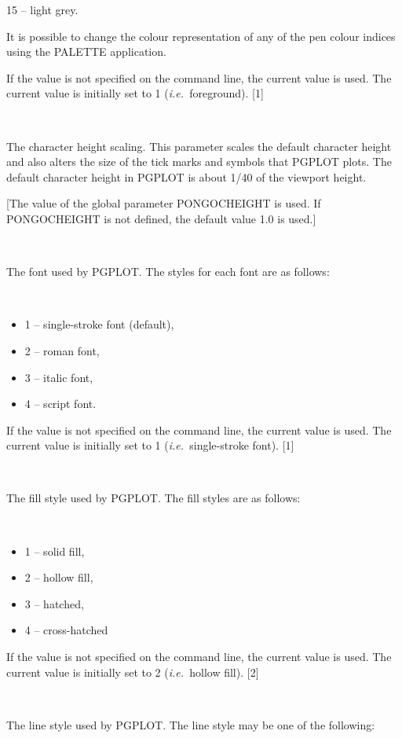 \documentclass[twoside,11pt]{article}
\renewcommand{\_}{\texttt{\symbol{95}}}
\newcommand{\ie}{{\em i.e.\ }}
\newcommand{\sstsubsection}[1]{ \item[{#1}] \mbox{} \\}
\newcommand{\sstitemlist}[1]{
  \mbox{} \\
  \vspace{-3.5ex}
  \begin{itemize}
     #1
  \end{itemize}
}
\newcommand{\sstitem}{\item}
\newcommand{\sstsubsection}[1]{\item[{#1}]}
\newcommand{\sstitemlist}[1]{
      \begin{itemize}
         #1
      \end{itemize}
      \\
   }
\newcommand{\sstitem}{\item}
\begin{document}
\begin{sloppypar}
{{{{            \sstitem
               15 -- light grey.

         }
         It is possible to change the colour representation of any of
         the pen colour indices using the PALETTE application.

         If the value is not specified on the command line, the current
         value is used. The current value is initially set to 1 
         (\ie foreground).
         [1]
      }
      \sstsubsection{
         CHEIGHT = \_REAL (Read and Write)
      }{
         The character height scaling. This parameter scales the
         default character height and also alters the size of the tick
         marks and symbols that PGPLOT plots. The default character
         height in PGPLOT is about 1/40 of the viewport height.

         [The value of the global parameter PONGO\_CHEIGHT is used. If
         PONGO\_CHEIGHT is not defined, the default value 1.0 is used.]
      }
      \sstsubsection{
         FONT = \_INTEGER (Read)
      }{
         The font used by PGPLOT. The styles for each font are as
         follows:

         \sstitemlist{

            \sstitem
               1 -- single-stroke font (default),

            \sstitem
               2 -- roman font,

            \sstitem
               3 -- italic font,

            \sstitem
               4 -- script font.

         }
         If the value is not specified on the command line, the current
         value is used. The current value is initially set to 1 
         (\ie single-stroke font).
         [1]
      }
      \sstsubsection{
         FILLSTY = \_INTEGER (Read)
      }{
         The fill style used by PGPLOT. The fill styles are as follows:

         \sstitemlist{

            \sstitem
               1 -- solid fill,

            \sstitem
               2 -- hollow fill,

            \sstitem
               3 -- hatched,

            \sstitem
               4 -- cross-hatched

         }
         If the value is not specified on the command line, the current
         value is used. The current value is initially set to 2 
         (\ie hollow fill).
         [2]
      }
      \sstsubsection{
         LINESTY = \_INTEGER (Read)
      }{
         The line style used by PGPLOT.  The line style may be one of
         the following:

}}}
\end{sloppypar}
\end{document}

